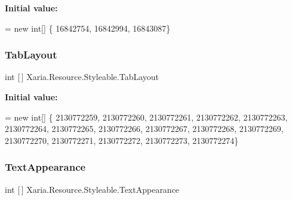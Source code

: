 {\bfseries Initial value\+:}
\begin{DoxyCode}
= \textcolor{keyword}{new} \textcolor{keywordtype}{int}[] \{
                    16842754,
                    16842994,
                    16843087\}
\end{DoxyCode}
\mbox{\label{classXaria_1_1Resource_1_1Styleable_af577e7d16e3b2124ac706d90eb2896ba}} 
\subsubsection{\texorpdfstring{Tab\+Layout}{TabLayout}}
{\footnotesize\ttfamily int \mbox{[}$\,$\mbox{]} Xaria.\+Resource.\+Styleable.\+Tab\+Layout\hspace{0.3cm}{\ttfamily [static]}}

{\bfseries Initial value\+:}
\begin{DoxyCode}
= \textcolor{keyword}{new} \textcolor{keywordtype}{int}[] \{
                    2130772259,
                    2130772260,
                    2130772261,
                    2130772262,
                    2130772263,
                    2130772264,
                    2130772265,
                    2130772266,
                    2130772267,
                    2130772268,
                    2130772269,
                    2130772270,
                    2130772271,
                    2130772272,
                    2130772273,
                    2130772274\}
\end{DoxyCode}
\mbox{\label{classXaria_1_1Resource_1_1Styleable_aa2c2bda987bb539a334d267860df4222}} 
\subsubsection{\texorpdfstring{Text\+Appearance}{TextAppearance}}
{\footnotesize\ttfamily int \mbox{[}$\,$\mbox{]} Xaria.\+Resource.\+Styleable.\+Text\+Appearance\hspace{0.3cm}{\ttfamily [static]}}

